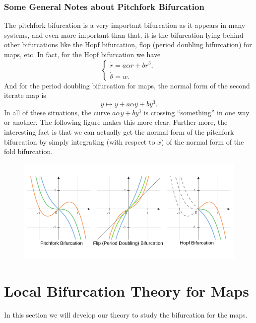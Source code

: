 \subsubsection{Some General Notes about Pitchfork Bifurcation}
The pitchfork bifurcation is a very important bifurcation as it appears in many systems, and even more important than that, it is the bifurcation lying behind other bifurcations like the Hopf bifurcation, flop (period doubling bifurcation) for maps, etc. In fact, for the Hopf bifurcation we have
\[  
\begin{cases}
	\dot{r}=a\alpha r + br^3,\\
	\dot{\theta} = w.
\end{cases}
\]
And for the period doubling bifurcation for maps, the normal form of the second iterate map is
\[ y \mapsto y + a\alpha y + by^3.\]
In all of these situations, the curve $a\alpha y + by^3$ is crossing ``something'' in one way or another. The following figure makes this more clear. Further more, the interesting fact is that we can actually get the normal form of the pitchfork bifurcation by simply integrating (with respect to $x$) of the normal form of the fold bifurcation.
\begin{figure}[h!]
	\centering
	\includegraphics[width=1\linewidth]{Images/PtichforkBifurcationIsTheKing}
	\label{fig:ptichforkbifurcationistheking}
\end{figure}

\FloatBarrier
 
\section{Local Bifurcation Theory for Maps}
In this section we will develop our theory to study the bifurcation for the maps.

